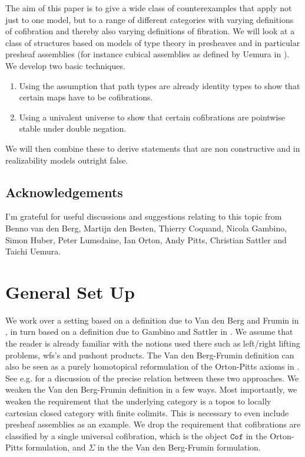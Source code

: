 \documentclass[a4paper]{amsart}
\theoremstyle{definition}
\begin{document}
The aim of this paper is to give a wide class of counterexamples that
apply not just to one model, but to a range of different categories with
varying definitions of cofibration and thereby also varying
definitions of fibration. We will look at a class of structures based
on models of type theory in presheaves and in particular presheaf
assemblies (for instance cubical assemblies as defined by Uemura in
\cite{uemuracubasm}). We develop two basic techniques.
\begin{enumerate}
\item Using the assumption that path types are already identity types
  to show that certain maps have to be cofibrations.
\item Using a univalent universe to show that certain cofibrations are
  pointwise stable under double negation.
\end{enumerate}

We will then combine these to derive statements that are non
constructive and in realizability models outright false.

\subsection*{Acknowledgements}
\label{sec:acknowledgements}

I'm grateful for useful discussions and suggestions relating to this
topic from Benno van den Berg, Martijn den Besten, Thierry Coquand,
Nicola Gambino, Simon Huber, Peter Lumsdaine, Ian Orton, Andy Pitts,
Christian Sattler and Taichi Uemura.

\section{General Set Up}
\label{sec:general-set-up}

We work over a setting based on a definition due to Van den Berg and
Frumin in \cite{vdbergfrumin}, in turn based on a definition due to
Gambino and Sattler in \cite{gambinosattlerpi}. We assume that the
reader is already familiar with the notions used there such as
left/right lifting problems, wfs's and pushout products.  The Van den
Berg-Frumin definition can also be seen as a purely homotopical
reformulation of the Orton-Pitts axioms in
\cite{pittsortoncubtopos}. See e.g. \cite[Section 7.5.2]{swanliftprob}
for a discussion of the precise relation between these two
approaches. We weaken the Van den Berg-Frumin definition in a few
ways. Most importantly, we weaken the requirement that the underlying
category is a topos to locally cartesian closed category with finite
colimits. This is necessary to even include presheaf assemblies as an
example. We drop the requirement that cofibrations are classified by a
single universal cofibration, which is the object $\mathtt{Cof}$ in
the Orton-Pitts formulation, and $\Sigma$ in the the Van den
Berg-Frumin formulation.
\end{document}
